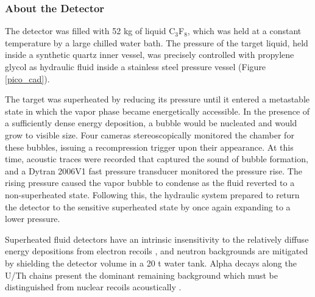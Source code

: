 \documentclass[10pt]{article}
\begin{document}
\subsubsection{About the Detector}

The detector was filled with 52 kg of liquid C$_3$F$_8$, which was held at a constant temperature by a large chilled water bath. The pressure of the target liquid, held inside a synthetic quartz inner vessel, was precisely controlled with propylene glycol as hydraulic fluid inside a stainless steel pressure vessel (Figure \ref{pico_cad}).

The target was superheated by reducing its pressure until it entered a metastable state in which the vapor phase became energetically accessible. In the presence of a sufficiently dense energy deposition, a bubble would be nucleated and would grow to visible size. Four cameras stereoscopically monitored the chamber for these bubbles, issuing a recompression trigger upon their appearance. At this time, acoustic traces were recorded that captured the sound of bubble formation, and a Dytran 2006V1 fast pressure transducer \cite{amole_thesis} monitored the pressure rise. The rising pressure caused the vapor bubble to condense as the fluid reverted to a non-superheated state. Following this, the hydraulic system prepared to return the detector to the sensitive superheated state by once again expanding to a lower pressure.

Superheated fluid detectors have an intrinsic insensitivity to the relatively diffuse energy depositions from electron recoils \cite{pico}, and neutron backgrounds are mitigated by shielding the detector volume in a 20 t water tank. Alpha decays along the U/Th chains present the dominant remaining background which must be distinguished from nuclear recoils acoustically \cite{isotopes}.
\end{document}
